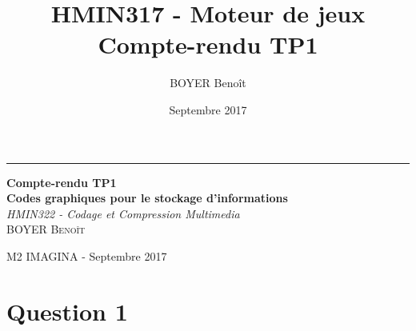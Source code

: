 \documentclass[a4paper,11pt]{report}
\title{HMIN317 - Moteur de jeux \\ Compte-rendu TP1}
\author{BOYER Benoît}
\date{Septembre 2017}
\begin{document}
  \begin{titlepage} %
	
	  \raggedleft %
	
	  \rule{1pt}{\textheight} %
	  \hspace{0.05\textwidth} %
	  \parbox[b]{0.75\textwidth}{ %
		
		  {\Huge\bfseries Compte-rendu TP1 \\[0.5\baselineskip] Codes graphiques pour le stockage d'informations}\\[2\baselineskip] %
		  {\large\textit{HMIN322 - Codage et Compression Multimedia}}\\[4\baselineskip] %
		  {\Large\textsc{BOYER Benoît}} %
		
		  \vspace{0.5\textheight} %
		
		  {\noindent M2 IMAGINA - Septembre 2017}\\[\baselineskip] %
	  }

  \end{titlepage}
  
    \tableofcontents
    \pagebreak

    \section{Question 1}
\end{document}
